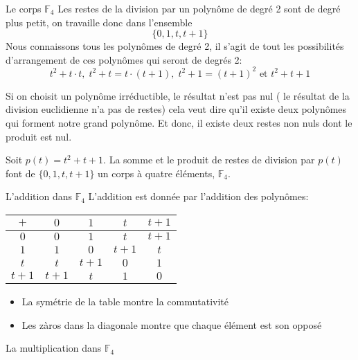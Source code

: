 \begin{parag}{Le corps $\mathbb{F}_4$}
    Les restes de la division par un polynôme de degré 2 sont de degré plus petit, on travaille donc dans l'ensemble
    \[\{0, 1,t, t+1\}\]
    Nous connaissons tous les polynômes de degré 2, il s'agit de tout les possibilités d'arrangement de ces polynômes qui seront de degrés 2:
    \[t^2 + t\cdot t, \; t^2 + t = t\cdot (t+1), \; t^2 + 1 = (t+1)^2 \text{ et } t^2 + t + 1\]
    \begin{framedremark}
        Si on choisit un polynôme irréductible, le résultat n'est pas nul ( le résultat de la division euclidienne n'a pas de restes) cela veut dire qu'il existe deux polynômes qui forment notre grand polynôme. Et donc, il existe deux restes non nuls dont le produit est nul.
    \end{framedremark}
    \begin{definition}
        Soit $p(t) = t^2 + t + 1$. La somme et le produit de restes de division par $p(t)$ font de $\{0, 1, t, t+1\}$ un corps à quatre éléments, $\mathbb{F}_4$.
    \end{definition}
    \begin{subparag}{L'addition dans $\mathbb{F}_4$}
        L'addition est donnée par l'addition des polynômes:
        \begin{tabular}{|c||c|c|c|c|}
        \hline
            $+$ & $0$ & $1$ & $t$ & $t+1$  \\
            \hline
            \hline
            $0$ & $0$ & $1$ & $t$ & $t+1$ \\
            \hline
            $1$ & $1$ & $0$ & $t+1$ & $t$ \\
            \hline
            $t$ & $t$ & $t+1$ & $0$ & $1$ \\
            \hline
            $t+1$ & $t+1$ & $t$ & $1$ & $0$ \\
            \hline
        \end{tabular}
        \begin{framedremark}
            \begin{itemize}
                \item La symétrie de la table montre la commutativité
                \item Les zàros dans la diagonale montre que chaque élément est son opposé
            \end{itemize}
        \end{framedremark}
    \end{subparag}
    \begin{subparag}{La multiplication dans $\mathbb{F}_4$}

\end{subparag}
\end{parag}
